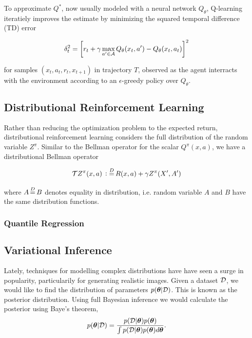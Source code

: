 \documentclass[twoside]{article}
\begin{document}
To approximate \(Q^*\), now usually modeled with a neural network \(Q_\theta\),
Q-learning~\citep{watkins89} iteratiely improves the estimate by minimizing the
squared temporal difference (TD) error

\begin{equation}
  \delta^2_t = \left[ r_t + \gamma \max_{a^\prime \in \mathcal{A}}
    Q_\theta(x_t, a^\prime) - Q_\theta(x_t, a_t) \right]^2
\end{equation}

for samples \((x_t, a_t, r_t, x_{t+1})\) in trajectory \(T\), observed as the
agent interracts with the environment according to an \(\epsilon\)-greedy policy
over \(Q_\theta\).

\subsection{Distributional Reinforcement Learning}

Rather than reducing the optimization problem to the expected return,
distributional reinforcement learning considers the full distribution of the
random variable \(Z^\pi\). Similar to the Bellman operator for the scalar
\(Q^\pi(x,a)\), we have a distributional Bellman operator

\begin{equation}
  \T Z^\pi(x, a) \distdefeq R(x, a) + \gamma Z^\pi(X^\prime, A^\prime)
\end{equation}

\noindent
where \(A \eqdist B\) denotes equality in distribution, i.e. random variable
\(A\) and \(B\) have the same distribution functions.

\subsubsection{Quantile Regression}

\subsection{Variational Inference}


Lately, techniques for modelling complex distributions have have seen a surge
in popularity, particularily for generating realistic images. Given a dataset
\(\mathcal{D}\), we would like to find the distribution of parameters
\(p(\boldsymbol \theta \vert \mathcal{D})\). This is known as the posterior distribution. Using
full Bayesian inference we would calculate the posterior using Baye's theorem,
\begin{equation}
  p(\boldsymbol \theta \vert \mathcal{D}) = \frac{p(\mathcal{D} \vert \boldsymbol \theta)p(\boldsymbol \theta)}{
    \int p(\mathcal{D} \vert \boldsymbol \theta) p(\boldsymbol \theta) d\boldsymbol \theta}.
\end{equation}
\end{document}
